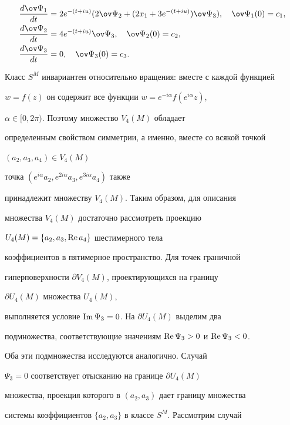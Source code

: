 \begin{align}


\frac{d\ov\Psi_1}{dt}&=2e^{-(t+iu)}(2\ov\Psi_2+


(2x_1+3e^{-(t+iu)})\ov\Psi_3), \quad \ov\Psi_1(0)=c_1,\notag \\


\frac{d\ov\Psi_2}{dt}&=4e^{-(t+iu)}\ov\Psi_3, \quad


\ov\Psi_2(0)=c_2, \\


\frac{d\ov\Psi_3}{dt}&=0, \quad \ov\Psi_3(0)=c_3.\notag


\end{align}





Класс $S^M$ инвариантен относительно вращения: вместе с каждой функцией


$w=f(z)$ он содержит все функции $w=e^{-i\alpha}f(e^{i\alpha}z)$,


$\alpha\in[0,2\pi)$. Поэтому множество $V_4(M)$ обладает


определенным свойством симметрии, а именно, вместе со всякой точкой


$(a_2,a_3,a_4)\in V_4(M)$


точка $(e^{i\alpha}a_2,e^{2i\alpha}a_3,e^{3i\alpha}a_4)$ также


принадлежит множеству $V_4(M)$. Таким образом, для описания


множества $V_4(M)$ достаточно рассмотреть проекцию


$U_4(M)=\{a_2,a_3,\operatorname{Re} a_4\}$ шестимерного тела


коэффициентов в пятимерное пространство. Для точек граничной


гиперповерхности $\partial V_4(M)$, проектирующихся на границу


$\partial U_4(M)$ множества $U_4(M)$,


выполняется условие $\operatorname{Im}\Psi_3=0$. На $\partial U_4(M)$ выделим два


подмножества, соответствующие значениям $\operatorname{Re}\Psi_3>0$ и $\operatorname{Re}\Psi_3<0$.


Оба эти подмножества исследуются аналогично. Случай


$\Psi_3=0$ соответствует отысканию на границе $\partial U_4(M)$


множества, проекция которого в $(a_2,a_3)$ дает границу множества


системы коэффициентов $\{a_2,a_3\}$ в классе $S^M$. Рассмотрим случай


